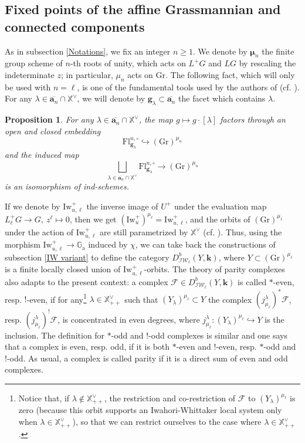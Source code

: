 \documentclass[11pt]{amsart}
\theoremstyle{plain}
\newtheorem{prop}[thm]{Proposition}
\theoremstyle{remark}
\numberwithin{equation}{section}
\begin{document}
	\subsection{Fixed points of the affine Grassmannian and connected components}\label{Fixed points of the affine Grassmannian and connected components} As in subsection \ref{Notations}, we fix an integer $n\geq1$. We denote by $\mathbf{\mu}_n$ the finite group scheme of $n$-th roots of unity, which acts on $L^+G$ and $LG$ by rescaling the indeterminate $z$; in particular, $\mu_n$ acts on $\mathrm{Gr}$. The following fact, which will only be used with $n=\ell$, is one of the fundamental tools used by the authors of \cite{riche2020smithtreumann} (cf. \cite[Proposition 4.7]{riche2020smithtreumann}). For any $\lambda\in\overline{\mathbf{a}_n}\cap\mathbb{X}^\vee$, we will denote by $\mathbf{g}_\lambda\subset\overline{\mathbf{a}_n}$ the facet which contains $\lambda$.
	\begin{prop}\label{connex}
		For any $\lambda\in\overline{\mathbf{a}_n}\cap\mathbb{X}^\vee$, the map $g\mapsto g\cdot [\lambda]$ factors through an open and closed embedding 
		$$\mathrm{Fl}^{n,\circ}_{\mathbf{g}_\lambda}\hookrightarrow (\mathrm{Gr})^{\mu_n}$$ and the induced map
		$$\bigsqcup_{\lambda\in \overline{\mathbf{a}_n}\cap\mathbb{X}^\vee}\mathrm{Fl}^{n,\circ}_{\mathbf{g}_\lambda}\to (\mathrm{Gr})^{\mu_n}$$
		is an isomorphism of ind-schemes.\end{prop}
	
	If we denote by $\mathrm{Iw}_{u,\ell}^+$ the inverse image of $U^+$ under the evaluation map $L_\ell^+G\to G,~z^\ell\mapsto 0$, then we get $(\mathrm{Iw}_u^+)^{\mu_\ell}=\mathrm{Iw}_{u,\ell}^+$, and the orbits of $(\mathrm{Gr})^{\mu_\ell}$ under the action of $\mathrm{Iw}_{u,\ell}^+$ are still parametrized by $\mathbb{X}^\vee$ (cf. \cite[Lemma 4.8]{riche2020smithtreumann}). Thus, using the morphism $\mathrm{Iw}_{u,\ell}^+\to \mathbb{G}_\mathrm{a}$ induced by $\chi$, we can take back the constructions of subsection \ref{IW variant} to define the category $D^b_{\mathcal{IW}_\ell}(Y,\mathbf{k})$, where $Y\subset (\mathrm{Gr})^{\mu_\ell}$ is a finite locally closed union of $\mathrm{Iw}_{u,\ell}^+$-orbits. The theory of parity complexes also adapts to the present context: a complex $\mathcal{F}\in D^b_{\mathcal{IW}_\ell}(Y,\mathbf{k})$ is called $*$-even, resp. $!$-even, if for any\footnote{Notice that, if $\lambda\notin\mathbb{X}^\vee_{++}$, the restriction and co-restriction of $\mathcal{F}$ to $(Y_\lambda)^{\mu_\ell}$ is zero (because this orbit supports an Iwahori-Whittaker local system only when $\lambda\in\mathbb{X}^\vee_{++}$), so that we can restrict ourselves to the case where $\lambda\in\mathbb{X}^\vee_{++}$.} $\lambda\in\mathbb{X}^\vee_{++}$ such that $(Y_\lambda)^{\mu_\ell}\subset Y$ the complex $(j_{\mu_\ell}^\lambda)^*\mathcal{F}$, resp. $(j_{\mu_\ell}^\lambda)^!\mathcal{F}$, is concentrated in even degrees, where $j_{\mu_\ell}^\lambda:(Y_\lambda)^{\mu_\ell}\hookrightarrow Y$ is the inclusion. The definition for $*$-odd and $!$-odd complexes is similar and one says that a complex is even, resp. odd, if it is both $*$-even and $!$-even, resp. $*$-odd and $!$-odd. As usual, a complex is called parity if it is a direct sum of even and odd complexes. 
	
\end{document}
